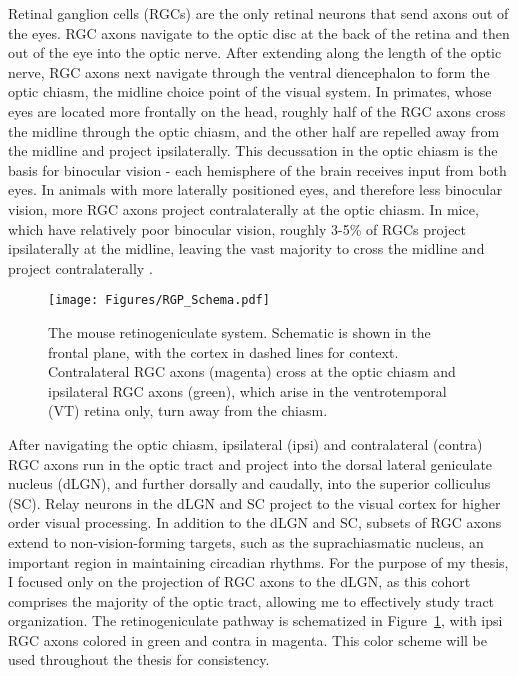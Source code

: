 Retinal ganglion cells (RGCs) are the only retinal neurons that send axons out of the eyes.
RGC axons navigate to the optic disc at the back of the retina and then out of the eye into the optic nerve.
After extending along the length of the optic nerve, RGC axons next navigate through the ventral diencephalon to form the optic chiasm, the midline choice point of the visual system.
In primates, whose eyes are located more frontally on the head, roughly half of the RGC axons cross the midline through the optic chiasm, and the other half are repelled away from the midline and project ipsilaterally.
This decussation in the optic chiasm is the basis for binocular vision - each hemisphere of the brain receives input from both eyes.
In animals with more laterally positioned eyes, and therefore less binocular vision, more RGC axons project contralaterally at the optic chiasm.
In mice, which have relatively poor binocular vision, roughly 3-5\% of RGCs project ipsilaterally at the midline, leaving the vast majority to cross the midline and project contralaterally \cite{petros2008retinal}.

\begin{figure}[hbtp]
    \begin{center}
        \texttt{[image: Figures/RGP\_Schema.pdf]}
        \caption[The mouse retinogeniculate system.]
        {The mouse retinogeniculate system.
        Schematic is shown in the frontal plane, with the cortex in dashed lines for context.
        Contralateral RGC axons (magenta) cross at the optic chiasm and ipsilateral RGC axons (green), which arise in the ventrotemporal (VT) retina only, turn away from the chiasm.}
        \label{Figures/RGPSchema}
    \end{center}
\end{figure}
After navigating the optic chiasm, ipsilateral (ipsi) and contralateral (contra) RGC axons run in the optic tract and project into the dorsal lateral geniculate nucleus (dLGN), and further dorsally and caudally, into the superior colliculus (SC).
Relay neurons in the dLGN and SC project to the visual cortex for higher order visual processing.
In addition to the dLGN and SC, subsets of RGC axons extend to non-vision-forming targets, such as the suprachiasmatic nucleus, an important region in maintaining circadian rhythms.
For the purpose of my thesis, I focused only on the projection of RGC axons to the dLGN, as this cohort comprises the majority of the optic tract, allowing me to effectively study tract organization.
The retinogeniculate pathway is schematized in Figure~\ref{Figures/RGPSchema}, with ipsi RGC axons colored in green and contra in magenta.
This color scheme will be used throughout the thesis for consistency.

